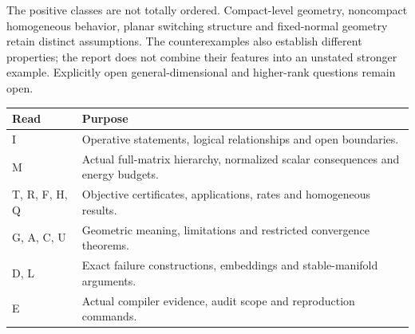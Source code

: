 The positive classes are not totally ordered. Compact-level geometry, noncompact homogeneous behavior, planar switching structure and fixed-normal geometry retain distinct assumptions. The counterexamples also establish different properties; the report does not combine their features into an unstated stronger example. Explicitly open general-dimensional and higher-rank questions remain open.

\begin{center}
\begin{tabular}{p{}p{}}
\toprule Read & Purpose\\\midrule
I & Operative statements, logical relationships and open boundaries.\\
M & Actual full-matrix hierarchy, normalized scalar consequences and energy budgets.\\
T, R, F, H, Q & Objective certificates, applications, rates and homogeneous results.\\
G, A, C, U & Geometric meaning, limitations and restricted convergence theorems.\\
D, L & Exact failure constructions, embeddings and stable-manifold arguments.\\
E & Actual compiler evidence, audit scope and reproduction commands.\\\bottomrule
\end{tabular}
\end{center}
